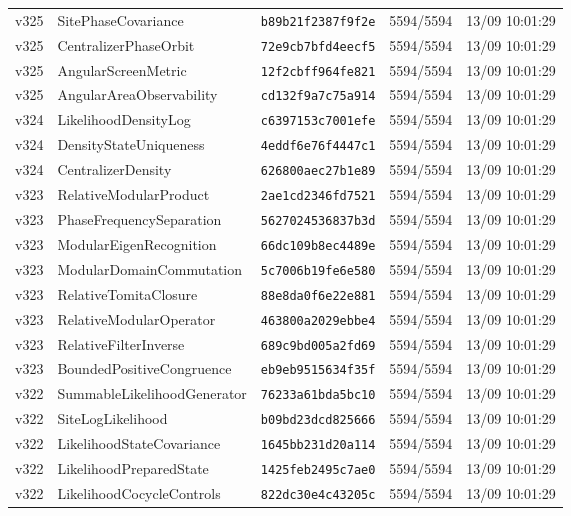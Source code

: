 \documentclass[11pt]{article}
\theoremstyle{definition}\newtheorem{deriv}{Derivação}
\begin{document}
{\begin{longtable}{@{}lllll@{}}
v325 & SitePhaseCovariance & \texttt{b89b21f2387f9f2e} & 5594/5594 & 13/09 10:01:29 \\
v325 & CentralizerPhaseOrbit & \texttt{72e9cb7bfd4eecf5} & 5594/5594 & 13/09 10:01:29 \\
v325 & AngularScreenMetric & \texttt{12f2cbff964fe821} & 5594/5594 & 13/09 10:01:29 \\
v325 & AngularAreaObservability & \texttt{cd132f9a7c75a914} & 5594/5594 & 13/09 10:01:29 \\
v324 & LikelihoodDensityLog & \texttt{c6397153c7001efe} & 5594/5594 & 13/09 10:01:29 \\
v324 & DensityStateUniqueness & \texttt{4eddf6e76f4447c1} & 5594/5594 & 13/09 10:01:29 \\
v324 & CentralizerDensity & \texttt{626800aec27b1e89} & 5594/5594 & 13/09 10:01:29 \\
v323 & RelativeModularProduct & \texttt{2ae1cd2346fd7521} & 5594/5594 & 13/09 10:01:29 \\
v323 & PhaseFrequencySeparation & \texttt{5627024536837b3d} & 5594/5594 & 13/09 10:01:29 \\
v323 & ModularEigenRecognition & \texttt{66dc109b8ec4489e} & 5594/5594 & 13/09 10:01:29 \\
v323 & ModularDomainCommutation & \texttt{5c7006b19fe6e580} & 5594/5594 & 13/09 10:01:29 \\
v323 & RelativeTomitaClosure & \texttt{88e8da0f6e22e881} & 5594/5594 & 13/09 10:01:29 \\
v323 & RelativeModularOperator & \texttt{463800a2029ebbe4} & 5594/5594 & 13/09 10:01:29 \\
v323 & RelativeFilterInverse & \texttt{689c9bd005a2fd69} & 5594/5594 & 13/09 10:01:29 \\
v323 & BoundedPositiveCongruence & \texttt{eb9eb9515634f35f} & 5594/5594 & 13/09 10:01:29 \\
v322 & SummableLikelihoodGenerator & \texttt{76233a61bda5bc10} & 5594/5594 & 13/09 10:01:29 \\
v322 & SiteLogLikelihood & \texttt{b09bd23dcd825666} & 5594/5594 & 13/09 10:01:29 \\
v322 & LikelihoodStateCovariance & \texttt{1645bb231d20a114} & 5594/5594 & 13/09 10:01:29 \\
v322 & LikelihoodPreparedState & \texttt{1425feb2495c7ae0} & 5594/5594 & 13/09 10:01:29 \\
v322 & LikelihoodCocycleControls & \texttt{822dc30e4c43205c} & 5594/5594 & 13/09 10:01:29 \\

\end{longtable}}
\end{document}
